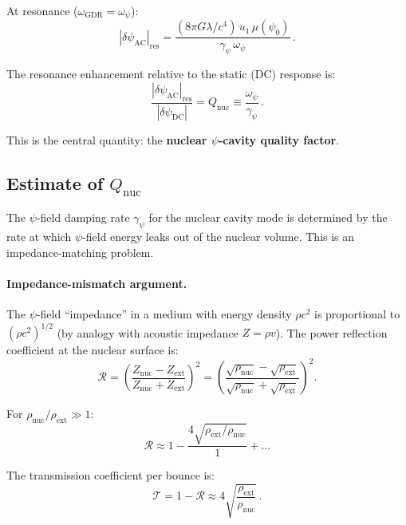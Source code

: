 \documentclass[aps,prd,twocolumn,superscriptaddress,nofootinbib]{revtex4-2}
\newcommand{\mufunction}{\mu}
\newcommand{\lam}{\lambda}
\newcommand{\Qnuc}{Q_{\mathrm{nuc}}}
\newcommand{\wGDR}{\omega_{\mathrm{GDR}}}
\newcommand{\wpsi}{\omega_\psi}
\newcommand{\gpsi}{\gamma_\psi}
\begin{document}
At resonance ($\wGDR = \wpsi$):
\begin{equation}\label{eq:at-resonance}
|\delta\psi_{\mathrm{AC}}|_{\mathrm{res}} =
\frac{(8\pi G\lam/c^4)\,u_1\,\mufunction(\psi_0)}
{\gpsi\,\wpsi}\,.
\end{equation}

The resonance enhancement relative to the static (DC) response is:
\begin{equation}\label{eq:Q-enhancement}
\frac{|\delta\psi_{\mathrm{AC}}|_{\mathrm{res}}}
{|\delta\psi_{\mathrm{DC}}|}
= \Qnuc \equiv \frac{\wpsi}{\gpsi}\,.
\end{equation}

This is the central quantity: the \textbf{nuclear $\psi$-cavity
quality factor}.

\subsection{Estimate of $\Qnuc$}
\label{sec:Q-estimate}

The $\psi$-field damping rate $\gpsi$ for the nuclear cavity mode
is determined by the rate at which $\psi$-field energy leaks out of
the nuclear volume.  This is an impedance-matching problem.

\paragraph{Impedance-mismatch argument.}
The $\psi$-field ``impedance'' in a medium with energy density $\rho c^2$
is proportional to $(\rho c^2)^{1/2}$ (by analogy with acoustic
impedance $Z = \rho v$).  The power reflection coefficient at the
nuclear surface is:
\begin{equation}\label{eq:reflection}
\mathcal{R} = \left(\frac{Z_{\mathrm{nuc}} - Z_{\mathrm{ext}}}
{Z_{\mathrm{nuc}} + Z_{\mathrm{ext}}}\right)^2
= \left(\frac{\sqrt{\rho_{\mathrm{nuc}}} - \sqrt{\rho_{\mathrm{ext}}}}
{\sqrt{\rho_{\mathrm{nuc}}} + \sqrt{\rho_{\mathrm{ext}}}}\right)^2.
\end{equation}

For $\rho_{\mathrm{nuc}}/\rho_{\mathrm{ext}} \gg 1$:
\begin{equation}
\mathcal{R} \approx 1 - \frac{4\sqrt{\rho_{\mathrm{ext}}/\rho_{\mathrm{nuc}}}}{1} + \ldots
\end{equation}

The transmission coefficient per bounce is:
\begin{equation}
\mathcal{T} = 1 - \mathcal{R} \approx
4\sqrt{\frac{\rho_{\mathrm{ext}}}{\rho_{\mathrm{nuc}}}}\,.
\end{equation}
\end{document}
